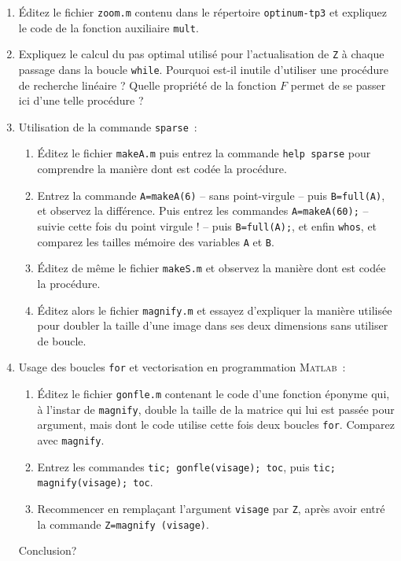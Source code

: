 \documentclass[10pt,a4paper,fleqn]{report}
\newcommand{\matlab}{\textsc{Matlab}}
\newcommand{\onit}{\begin{enumerate}}
\newcommand{\offit}{\end{enumerate}}
\renewcommand{\tt}{\texttt}
\begin{document}
\onit
\item \'Editez le fichier \tt{zoom.m} contenu dans le répertoire \tt{optinum-tp3} et expliquez le code de la fonction auxiliaire \tt{mult}.
\item Expliquez le calcul du pas optimal utilisé pour l'actualisation de \tt Z à chaque passage dans la boucle \tt{while}. Pourquoi est-il inutile d'utiliser une procédure de recherche linéaire ? Quelle propriété de la fonction $F$ permet de se passer ici d'une telle procédure ?
\item Utilisation de la commande \tt{sparse}~:
\onit
\item \'Editez le fichier \tt{makeA.m} puis entrez la commande \tt{help sparse} pour comprendre la manière dont est codée la procédure.
\item Entrez la commande \tt{A=makeA(6)} -- sans point-virgule -- puis \tt{B=full(A)}, et observez la différence. Puis entrez les commandes \tt{A=makeA(60);} -- suivie cette fois du point virgule ! -- puis \tt{B=full(A);}, et enfin \tt{whos}, et comparez les tailles mémoire des variables \tt A et \tt B.
\item \'Editez de même le fichier \tt{makeS.m} et observez la manière dont est codée la procédure.
\item \'Editez alors le fichier \tt{magnify.m} et essayez d'expliquer la manière utilisée pour doubler la taille d'une image dans ses deux dimensions sans utiliser de boucle.
\offit
\item Usage des boucles \tt{for} et vectorisation en programmation \matlab~:
\onit
\item \'Editez le fichier \tt{gonfle.m} contenant le code d'une fonction éponyme qui, à l'instar de \tt{magnify}, double la taille de la matrice qui lui est passée pour argument, mais dont le code utilise cette fois deux boucles \tt{for}. Comparez avec \tt{magnify}.
\item Entrez les commandes \tt{tic; gonfle(visage); toc}, puis \tt{tic; magnify(visage); toc}.
\item Recommencer en remplaçant l'argument \tt{visage} par \tt{Z}, après avoir entré la commande \tt{Z=magnify (visage)}.
\offit
Conclusion?
\offit
\end{document}
